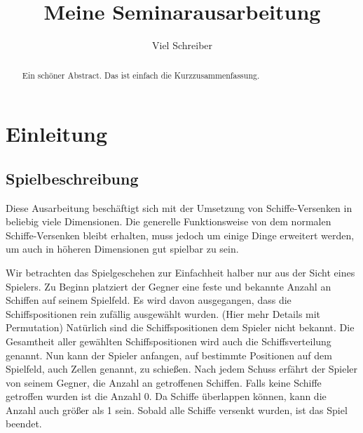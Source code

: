 \documentclass[a4paper,12pt]{llncs}
\numberwithin{equation}{section}
\begin{document}

\author{Viel Schreiber}

\title{Meine Seminarausarbeitung}

\maketitle

\thispagestyle{empty}

\begin{abstract}
Ein schöner Abstract. Das ist einfach die Kurzzusammenfassung.
\end{abstract}

\section{Einleitung}

\subsection{Spielbeschreibung}
Diese Ausarbeitung beschäftigt sich mit der Umsetzung von Schiffe-Versenken in beliebig viele Dimensionen.
Die generelle Funktionsweise von dem normalen Schiffe-Versenken bleibt erhalten, muss jedoch um einige Dinge erweitert werden, um auch in höheren Dimensionen gut spielbar zu sein.

Wir betrachten das Spielgeschehen zur Einfachheit halber nur aus der Sicht eines Spielers.
Zu Beginn platziert der Gegner eine feste und bekannte Anzahl an Schiffen auf seinem Spielfeld. Es wird davon ausgegangen, dass die Schiffspositionen rein zufällig ausgewählt wurden. (Hier mehr Details mit Permutation)
Natürlich sind die Schiffspositionen dem Spieler nicht bekannt.
Die Gesamtheit aller gewählten Schiffspositionen wird auch die Schiffsverteilung genannt.
Nun kann der Spieler anfangen, auf bestimmte Positionen auf dem Spielfeld, auch Zellen genannt, zu schießen.
Nach jedem Schuss erfährt der Spieler von seinem Gegner, die Anzahl an getroffenen Schiffen.
Falls keine Schiffe getroffen wurden ist die Anzahl 0.
Da Schiffe überlappen können, kann die Anzahl auch größer als 1 sein.
Sobald alle Schiffe versenkt wurden, ist das Spiel beendet.
\end{document}
